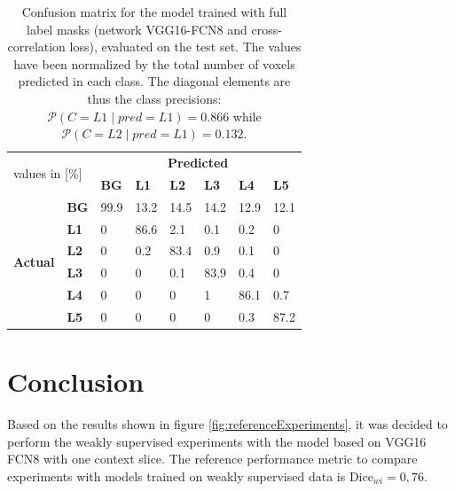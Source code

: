 \begin{table}
 
\begin{tabular}{cl|llllll}
    \toprule
    \multicolumn{2}{l|}{\multirow{2}{*}{values in {[}\%{]}}} & \multicolumn{6}{c}{\textbf{Predicted}}                                            \\
    \multicolumn{2}{l|}{}                                    & \textbf{BG} & \textbf{L1} & \textbf{L2} & \textbf{L3} & \textbf{L4} & \textbf{L5} \\ \hline
    \multirow{6}{*}{\textbf{Actual}}      & \textbf{BG}      & 99.9        & 13.2        & 14.5        & 14.2        & 12.9        & 12.1        \\
     & \textbf{L1} & 0 & 86.6 & 2.1  & 0.1  & 0.2  & 0    \\
     & \textbf{L2} & 0 & 0.2  & 83.4 & 0.9  & 0.1  & 0    \\
     & \textbf{L3} & 0 & 0    & 0.1  & 83.9 & 0.4  & 0    \\
     & \textbf{L4} & 0 & 0    & 0    & 1    & 86.1 & 0.7  \\
     & \textbf{L5} & 0 & 0    & 0    & 0    & 0.3  & 87.2 \\ \bottomrule
    \end{tabular}

    \caption{Confusion matrix for the model trained with full label masks (network VGG16-FCN8 and cross-correlation loss), evaluated on the test set.
    The values have been normalized by the total number of voxels predicted in each class.
    The diagonal elements are thus the class precisions: $\mathcal{P}(C = L1 \mid pred = L1) = 0.866$ while $\mathcal{P}(C = L2 \mid pred = L1) = 0.132$.
    \label{tab:full_confusionMatrix}}
\end{table}

\section{Conclusion}
\par{
    Based on the results shown in figure \ref{fig:referenceExperiments}, it was decided to perform the weakly supervised experiments with the model based on VGG16 FCN8 with one context slice.
    The reference performance metric to compare experiments with models trained on weakly supervised data is $\text{Dice}_{wi}=0,76$.
}



